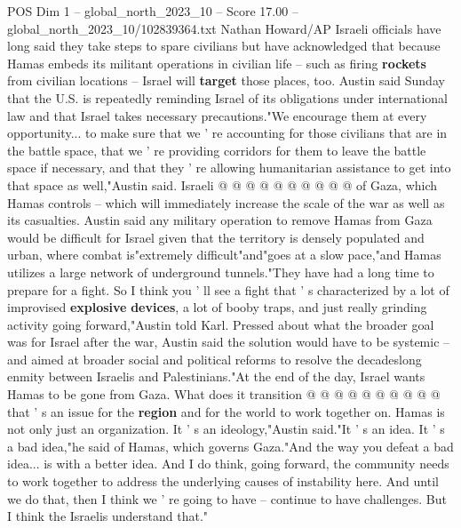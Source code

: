 \begin{textsample}{POS Dim 1 – global\_north\_2023\_10 – Score 17.00 – global\_north\_2023\_10/102839364.txt}
Nathan Howard/AP Israeli officials have long said they take steps to spare civilians but have acknowledged that because Hamas embeds its militant operations in civilian life -- such as firing \textbf{rockets} from civilian locations -- Israel will \textbf{target} those places, too.
Austin said Sunday that the U.S. is repeatedly reminding Israel of its obligations under international law and that Israel takes necessary precautions."We encourage them at every opportunity... to make sure that we ' re accounting for those civilians that are in the battle space, that we ' re providing corridors for them to leave the battle space if necessary, and that they ' re allowing humanitarian assistance to get into that space as well,"Austin said.
Israeli @ @ @ @ @ @ @ @ @ @ of Gaza, which Hamas controls -- which will immediately increase the scale of the war as well as its casualties.
Austin said any military operation to remove Hamas from Gaza would be difficult for Israel given that the territory is densely populated and urban, where combat is"extremely difficult"and"goes at a slow pace,"and Hamas utilizes a large network of underground tunnels."They have had a long time to prepare for a fight.
So I think you ' ll see a fight that ' s characterized by a lot of improvised \textbf{explosive} \textbf{devices}, a lot of booby traps, and just really grinding activity going forward,"Austin told Karl.
Pressed about what the broader goal was for Israel after the war, Austin said the solution would have to be systemic -- and aimed at broader social and political reforms to resolve the decadeslong enmity between Israelis and Palestinians."At the end of the day, Israel wants Hamas to be gone from Gaza.
What does it transition @ @ @ @ @ @ @ @ @ @ that ' s an issue for the \textbf{region} and for the world to work together on.
Hamas is not only just an organization.
It ' s an ideology,"Austin said."It ' s an idea.
It ' s a bad idea,"he said of Hamas, which governs Gaza."And the way you defeat a bad idea... is with a better idea.
And I do think, going forward, the community needs to work together to address the underlying causes of instability here.
And until we do that, then I think we ' re going to have -- continue to have challenges.
But I think the Israelis understand that."

\end{textsample}
